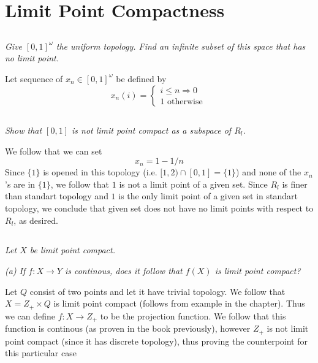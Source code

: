 \documentclass[11pt,oneside,titlepage]{book}
\DeclareMathOperator \ra {\Rightarrow}
\newcommand{\set}[1]{\{ #1 \}}
\begin{document}
\section{Limit Point Compactness}

\subsection{}

\textit{Give $[0, 1]^\omega$ the uniform topology. Find an infinite subset of this
  space that has no limit point.}

Let sequence of $x_n \in [0, 1]^\omega$ be defined by
$$x_n(i) =
\begin{cases}
  i \leq n \ra 0 \\
  1 \text{ otherwise}
\end{cases}\
$$

\subsection{}

\textit{Show that $[0, 1]$ is not limit point compact as a subspace of $R_l$.}

We follow that we can set
$$x_n = 1 - 1/n$$
Since $\set{1}$ is opened in this topology (i.e. $[1, 2) \cap [0, 1] = \set{1}$) and
none of the $x_n$'s are in $\set{1}$, we follow that $1$ is not a limit point of a given
set. Since $R_l$ is finer than standart topology and $1$ is the only limit point of
a given set in standart topology, we conclude that given set does not have no limit points
with respect to $R_l$, as desired.

\subsection{}

\textit{Let $X$ be limit point compact.}

\textit{(a) If $f: X \to Y$ is continous, does it follow that $f(X)$ is limit point compact?}

Let $Q$ consist of two points and let it have trivial topology. We follow that
$X = Z_+ \times Q$ is limit point compact (follows from example in the chapter). Thus we can define
$f: X \to Z_+$ to be the projection function. We follow that this function is continous
(as proven in the book previously), however $Z_+$ is not limit point compact (since it
has discrete topology), thus proving the counterpoint for this particular case
\end{document}

